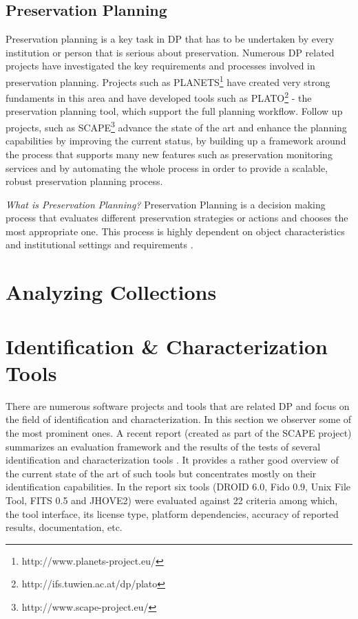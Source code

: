 \subsection{Preservation Planning}
Preservation planning is a key task in DP that has to be undertaken by every institution or person that is serious about preservation. Numerous DP related projects have investigated the key requirements and processes involved in preservation planning. Projects such as PLANETS\footnote{http://www.planets-project.eu/} have created very strong fundaments in this area and have developed tools such as PLATO\footnote{http://ifs.tuwien.ac.at/dp/plato} - the preservation planning tool, which support the full planning workflow. Follow up projects, such as SCAPE\footnote{http://www.scape-project.eu/} advance the state of the art and enhance the planning capabilities by improving the current status, by building up a framework around the process that supports many new features such as preservation monitoring services and by automating the whole process in order to provide a scalable, robust preservation planning process.\newline

\noindent\textit{What is Preservation Planning?}\newline
Preservation Planning is a decision making process that evaluates different preservation strategies or actions and chooses the most appropriate one. This process is highly dependent on object characteristics and institutional settings and requirements \cite{STR07_jcdl}.


\section{Analyzing Collections}

\section{Identification \& Characterization Tools}
There are numerous software projects and tools that are related DP and focus on the field of identification and characterization. In this section we observer some of the most prominent ones. A recent report (created as part of the SCAPE project) summarizes an evaluation framework and the results of the tests of several identification and characterization tools \cite{Knijff:2011it}. It provides a rather good overview of the current state of the art of such tools but concentrates mostly on their identification capabilities. In the report six tools (DROID 6.0, Fido 0.9, Unix File Tool, FITS 0.5 and JHOVE2) were evaluated against 22 criteria among which, the tool interface, its license type, platform dependencies, accuracy of reported results, documentation, etc.

